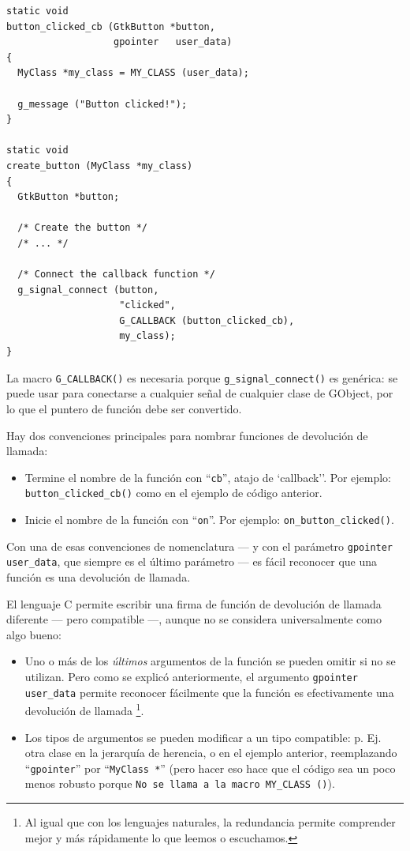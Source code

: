 \begin{lstlisting}[float, caption={How to connect to a signal}, label=oop-gobject-connect-to-signal]
static void
button_clicked_cb (GtkButton *button,
                   gpointer   user_data)
{
  MyClass *my_class = MY_CLASS (user_data);

  g_message ("Button clicked!");
}

static void
create_button (MyClass *my_class)
{
  GtkButton *button;

  /* Create the button */
  /* ... */

  /* Connect the callback function */
  g_signal_connect (button,
                    "clicked",
                    G_CALLBACK (button_clicked_cb),
                    my_class);
}
\end{lstlisting}

La macro \lstinline{G_CALLBACK()} es necesaria porque \lstinline{g_signal_connect()} es genérica: se puede usar para conectarse a cualquier señal de cualquier clase de GObject, por lo que el puntero de función debe ser convertido.

Hay dos convenciones principales para nombrar funciones de devolución de llamada:
\begin{itemize}
  \item Termine el nombre de la función con ``\lstinline{cb}'', atajo de `callback''. Por ejemplo: \lstinline{button_clicked_cb()} como en el ejemplo de código anterior.
  \item Inicie el nombre de la función con ``\lstinline{on}''. Por ejemplo: \lstinline{on_button_clicked()}.
\end{itemize}

Con una de esas convenciones de nomenclatura --- y con el parámetro \lstinline{gpointer user_data}, que siempre es el último parámetro --- es fácil reconocer que una función es una devolución de llamada.

El lenguaje C permite escribir una firma de función de devolución de llamada diferente --- pero compatible ---, aunque no se considera universalmente como algo bueno:
\begin{itemize}
  \item Uno o más de los \emph{últimos} argumentos de la función se pueden omitir si no se utilizan. Pero como se explicó anteriormente, el argumento \lstinline{gpointer user_data} permite reconocer fácilmente que la función es efectivamente una devolución de llamada \footnote{Al igual que con los lenguajes naturales, la redundancia permite comprender mejor y más rápidamente lo que leemos o escuchamos.}.
  \item Los tipos de argumentos se pueden modificar a un tipo compatible: p. Ej. otra clase en la jerarquía de herencia, o en el ejemplo anterior, reemplazando ``\lstinline{gpointer}'' por ``\lstinline{MyClass *}'' (pero hacer eso hace que el código sea un poco menos robusto porque \lstinline{No se llama a la macro MY_CLASS ()}).
\end{itemize}

